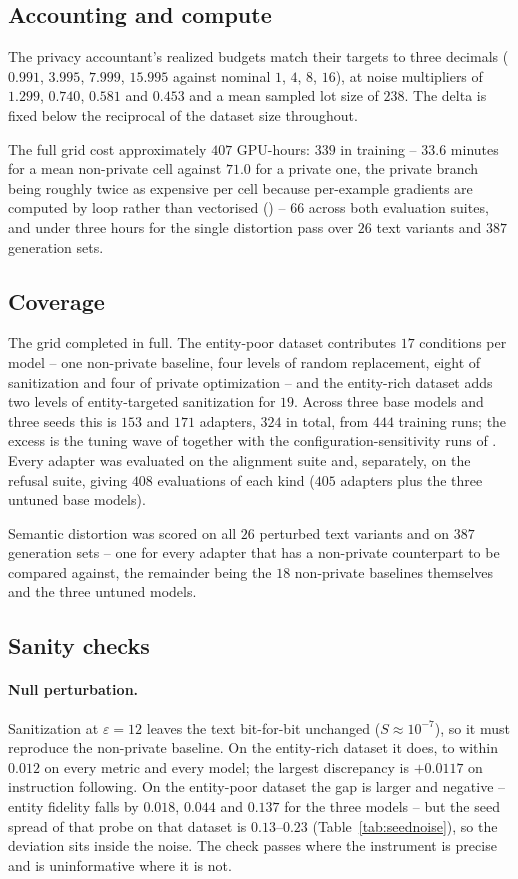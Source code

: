 \subsection{Accounting and compute}
The privacy accountant's realized budgets match their targets to three decimals ($0.991$, $3.995$, $7.999$, $15.995$ against nominal $1$, $4$, $8$, $16$),
at noise multipliers of $1.299$,
$0.740$,
$0.581$ and $0.453$ and a mean sampled lot size of $238$.
The delta is fixed below the reciprocal of the dataset size throughout.

The full grid cost approximately $407$ GPU-hours:
$339$ in training -- $33.6$ minutes for a mean non-private cell against $71.0$ for a private one,
the private branch being roughly twice as expensive per cell because per-example gradients are computed by loop rather than vectorised () -- $66$ across both evaluation suites,
and under three hours for the single distortion pass over $26$ text variants and $387$ generation sets.

\subsection{Coverage}
The grid completed in full.
The entity-poor dataset contributes $17$ conditions per model -- one non-private baseline,
four levels of random replacement,
eight of sanitization and four of private optimization -- and the entity-rich dataset adds two levels of entity-targeted sanitization for $19$.
Across three base models and three seeds this is $153$ and $171$ adapters,
$324$ in total,
from $444$ training runs;
the excess is the tuning wave of  together with the configuration-sensitivity runs of .
Every adapter was evaluated on the alignment suite and,
separately,
on the refusal suite,
giving $408$ evaluations of each kind ($405$ adapters plus the three untuned base models).

Semantic distortion was scored on all $26$ perturbed text variants and on $387$ generation sets -- one for every adapter that has a non-private counterpart to be compared against,
the remainder being the $18$ non-private baselines themselves and the three untuned models.

\subsection{\label{apx:sanity}Sanity checks}
\paragraph{Null perturbation.}
Sanitization at $\varepsilon = 12$ leaves the text bit-for-bit unchanged ($S \approx 10^{-7}$),
so it must reproduce the non-private baseline.
On the entity-rich dataset it does,
to within $0.012$ on every metric and every model;
the largest discrepancy is $+0.0117$ on instruction following.
On the entity-poor dataset the gap is larger and negative -- entity fidelity falls by $0.018$,
$0.044$ and $0.137$ for the three models -- but the seed spread of that probe on that dataset is $0.13$--$0.23$ (Table~\ref{tab:seednoise}),
so the deviation sits inside the noise.
The check passes where the instrument is precise and is uninformative where it is not.

